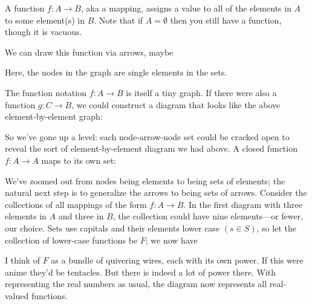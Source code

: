 \documentclass[11pt]{article}
\begin{document}
A function $f:A\to B$, aka a mapping, assigns a value to all of the elements in $A$ to
some element(s) in $B$. Note that if $A=\emptyset$ then you still have a function, though
it is vacuous.

We can draw this function via arrows, maybe


Here, the nodes in the graph are single elements in the sets.

The function notation $f:A\to B$ is itself a tiny graph. If there were also a function
$g:C\to B$, we could construct a diagram that looks like the above element-by-element graph:

So we've gone up a level: each node-arrow-node set could be cracked open to reveal the
sort of element-by-element diagram we had above. A closed function $f:A\to A$ maps to its
own set:


We've zoomed out from nodes being elements to being sets of elements; the natural next
step is to generalize the arrows to being sets of arrows. Consider the collections of all
mappings of the form $f:A\to B$. In the first diagram with three elements in $A$ and
three in $B$, the collection could have nine elements---or fewer, our choice. Sets
use capitals and their elements lower case $(s\in S)$, so let the collection of
lower-case functions be $F$; we now have


I think of $F$ as a bundle of quivering wires, each with its own power. If this were anime
they'd be tentacles. But there is indeed a lot of power there. With \Re representing the
real numbers as usual, the diagram 
now represents all real-valued functions.
\end{document}
